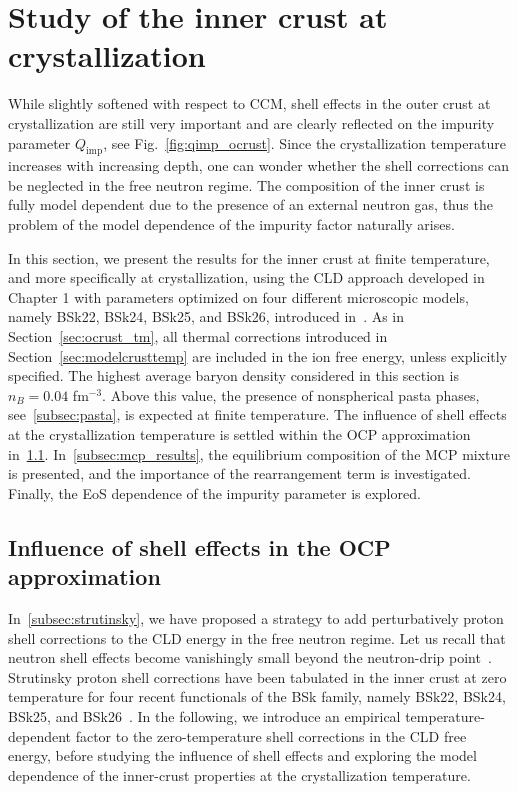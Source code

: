 \section{Study of the inner crust at crystallization}\label{sec:icrust_tm}

While slightly softened with respect to CCM, shell effects in the outer 
crust at crystallization are still very important and are clearly reflected on 
the impurity parameter $Q_{\text{imp}}$, see Fig.~\ref{fig:qimp_ocrust}. 
Since the crystallization temperature increases with increasing depth, one can
wonder whether the shell corrections can be neglected in the free neutron
regime.
%
The composition of the inner crust is fully model dependent due to the presence
of an external neutron gas, thus the problem of the model dependence of the 
impurity factor naturally arises.

In this section, we present the results for the inner crust at finite
temperature, and more specifically at crystallization, using the CLD approach
developed in Chapter 1 with parameters optimized on four different microscopic
models, namely BSk22, BSk24, BSk25, and BSk26, introduced 
in~\cite{Goriely2013}.
As in Section~\ref{sec:ocrust_tm}, all thermal corrections introduced in
Section~\ref{sec:modelcrusttemp} are included in the ion free energy, unless
explicitly specified.
The highest average baryon density considered in this section is $n_B = 0.04$
fm$^{-3}$. Above this value, the presence of nonspherical pasta phases,
see~\ref{subsec:pasta}, is expected at finite temperature.
The influence of shell effects at the crystallization temperature is 
settled within the OCP approximation in~\ref{subsec:shtemp}.
In~\ref{subsec:mcp_results}, the equilibrium 
composition of the MCP mixture is presented, and the importance of the 
rearrangement term is investigated. Finally, the EoS dependence of the 
impurity parameter is explored.

\subsection{Influence of shell effects in the OCP
approximation}\label{subsec:shtemp}

In~\ref{subsec:strutinsky}, we have proposed a strategy to add perturbatively 
proton shell corrections to the CLD energy in the free neutron
regime. Let us recall that neutron shell effects become vanishingly small 
beyond the neutron-drip point~\cite{Chamel2006,Chamel2007}.
Strutinsky proton shell corrections have been tabulated in the inner 
crust at zero temperature for four recent functionals of the BSk family, namely 
BSk22, BSk24, BSk25, and BSk26~\cite{Pearson2018}. In the following, we 
introduce an empirical temperature-dependent factor to the zero-temperature 
shell corrections in the CLD free energy, before studying the influence of 
shell effects and exploring the model dependence of the inner-crust properties 
at the crystallization temperature.

